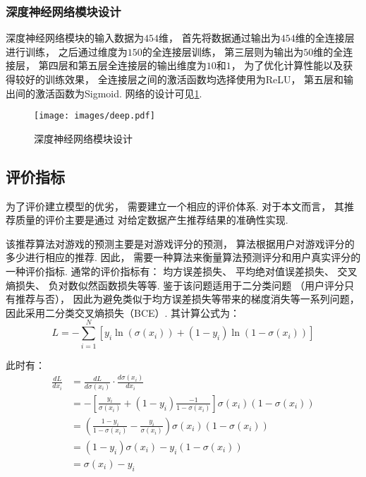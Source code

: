 \subsubsection{深度神经网络模块设计}

深度神经网络模块的输入数据为$454$维，
首先将数据通过输出为$454$维的全连接层进行训练，
之后通过维度为$150$的全连接层训练，
第三层则为输出为$50$维的全连接层，
第四层和第五层全连接层的输出维度为$10$和$1$，
为了优化计算性能以及获得较好的训练效果，
全连接层之间的激活函数均选择使用为ReLU，
第五层和输出间的激活函数为Sigmoid.
网络的设计可见\cref{fig:deep}.

\begin{figure}[!htbp]
	\centering
	\texttt{[image: images/deep.pdf]}
	\caption{深度神经网络模块设计}\label{fig:deep}
\end{figure}

\subsection{评价指标}

为了评价建立模型的优劣，
需要建立一个相应的评价体系.
对于本文而言，
其推荐质量的评价主要是通过
对给定数据产生推荐结果的准确性实现.

该推荐算法对游戏的预测主要是对游戏评分的预测，
算法根据用户对游戏评分的多少进行相应的推荐.
因此，
需要一种算法来衡量算法预测评分和用户真实评分的
一种评价指标.
通常的评价指标有：
均方误差损失、
平均绝对值误差损失、
交叉熵损失、
负对数似然函数损失等等.
鉴于该问题适用于二分类问题
（用户评分只有推荐与否），
因此为避免类似于均方误差损失等带来的梯度消失等一系列问题，
因此采用二分类交叉熵损失（BCE）.
其计算公式为：
\begin{equation}
	L=-\sum_{i=1}^{N}\left[y_{i} \ln \left(\sigma\left(x_{i}\right)\right)+\left(1-y_{i}\right) \ln \left(1-\sigma\left(x_{i}\right)\right)\right]
\end{equation}

此时有：
\begin{equation}
	\begin{aligned}
		\frac{d L}{d x_{i}} & =\frac{d L}{d \sigma\left(x_{i}\right)} \cdot \frac{d \sigma\left(x_{i}\right)}{d x_{i}}                                                                                         \\
		                    & =-\left[\frac{y_{i}}{\sigma\left(x_{i}\right)}+\left(1-y_{i}\right) \frac{-1}{1-\sigma\left(x_{i}\right)}\right] \sigma\left(x_{i}\right)\left(1-\sigma\left(x_{i}\right)\right) \\
		                    & =\left(\frac{1-y_{i}}{1-\sigma\left(x_{i}\right)}-\frac{y_{i}}{\sigma\left(x_{i}\right)}\right) \sigma\left(x_{i}\right)\left(1-\sigma\left(x_{i}\right)\right)                  \\
		                    & =\left(1-y_{i}\right) \sigma\left(x_{i}\right)-y_{i}\left(1-\sigma\left(x_{i}\right)\right)                                                                                      \\
		                    & =\sigma\left(x_{i}\right)-y_{i}
	\end{aligned}
\end{equation}

